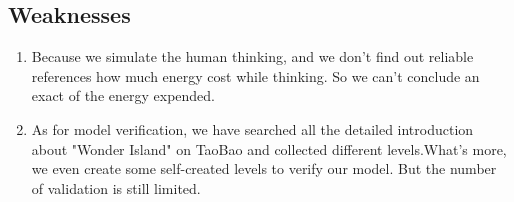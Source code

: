\documentclass[12pt,a4paper,]{article}
\begin{document}
\subsection{Weaknesses}
\begin{enumerate}[(1)]
\item Because we simulate the human thinking, and we don't find out reliable references how much energy cost while thinking. So we can't conclude an exact of the energy expended.
\item As for model verification, we have searched all the detailed introduction about "Wonder Island" on TaoBao and collected different levels.What's more, we even create some self-created levels to verify our model. But the number of validation is still limited.
\end{enumerate}
\end{document}

